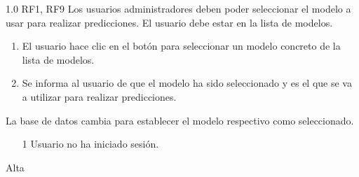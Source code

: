 {1.0}
{RF1, RF9}
{Los usuarios administradores deben poder seleccionar el modelo a usar para realizar predicciones.}
{El usuario debe estar en la lista de modelos.}
{
    \begin{enumerate}
        \def\labelenumi{\arabic{enumi}.}
        \tightlist
        \item El usuario hace clic en el botón para seleccionar un modelo
              concreto de la lista de modelos.
        \item Se informa al usuario de que el modelo ha sido seleccionado y es
              el que se va a utilizar para realizar predicciones.
    \end{enumerate}
}
{
    La base de datos cambia para establecer el modelo respectivo como seleccionado.
}
{
    \begin{itemize}
        \item [1] Usuario no ha iniciado sesión.
    \end{itemize}
}
{Alta}
